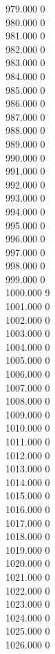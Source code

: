 { 979.000	0 \\
 980.000	0 \\
 981.000	0 \\
 982.000	0 \\
 983.000	0 \\
 984.000	0 \\
 985.000	0 \\
 986.000	0 \\
 987.000	0 \\
 988.000	0 \\
 989.000	0 \\
 990.000	0 \\
 991.000	0 \\
 992.000	0 \\
 993.000	0 \\
 994.000	0 \\
 995.000	0 \\
 996.000	0 \\
 997.000	0 \\
 998.000	0 \\
 999.000	0 \\
 1000.000	9 \\
 1001.000	0 \\
 1002.000	0 \\
 1003.000	0 \\
 1004.000	0 \\
 1005.000	0 \\
 1006.000	0 \\
 1007.000	0 \\
 1008.000	0 \\
 1009.000	0 \\
 1010.000	0 \\
 1011.000	0 \\
 1012.000	0 \\
 1013.000	0 \\
 1014.000	0 \\
 1015.000	0 \\
 1016.000	0 \\
 1017.000	0 \\
 1018.000	0 \\
 1019.000	0 \\
 1020.000	0 \\
 1021.000	0 \\
 1022.000	0 \\
 1023.000	0 \\
 1024.000	0 \\
 1025.000	0 \\
 1026.000	0 \\
}
